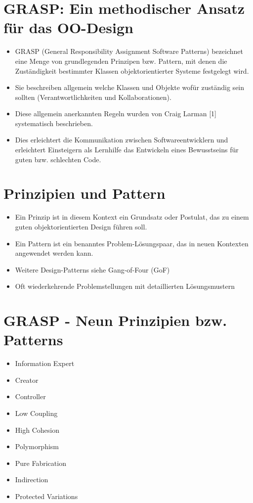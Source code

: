 \documentclass[10pt]{article}
\begin{document}
\section*{GRASP: Ein methodischer Ansatz für das OO-Design}
\begin{itemize}
  \item GRASP (General Responsibility Assignment Software Patterns) bezeichnet eine Menge von grundlegenden Prinzipen bzw. Pattern, mit denen die Zuständigkeit bestimmter Klassen objektorientierter Systeme festgelegt wird.
  \item Sie beschreiben allgemein welche Klassen und Objekte wofür zuständig sein sollten (Verantwortlichkeiten und Kollaborationen).
  \item Diese allgemein anerkannten Regeln wurden von Craig Larman [1] systematisch beschrieben.
  \item Dies erleichtert die Kommunikation zwischen Softwareentwicklern und erleichtert Einsteigern als Lernhilfe das Entwickeln eines Bewusstseins für guten bzw. schlechten Code.
\end{itemize}

\section*{Prinzipien und Pattern}
\begin{itemize}
  \item Ein Prinzip ist in diesem Kontext ein Grundsatz oder Postulat, das zu einem guten objektorientierten Design führen soll.
  \item Ein Pattern ist ein benanntes Problem-Lösungspaar, das in neuen Kontexten angewendet werden kann.
  \item Weitere Design-Patterns siehe Gang-of-Four (GoF)
  \item Oft wiederkehrende Problemstellungen mit detaillierten Lösungsmustern
\end{itemize}

\section*{GRASP - Neun Prinzipien bzw. Patterns}
\begin{itemize}
  \item Information Expert
  \item Creator
  \item Controller
  \item Low Coupling
  \item High Cohesion
  \item Polymorphism
  \item Pure Fabrication
  \item Indirection
  \item Protected Variations
\end{itemize}
\end{document}
